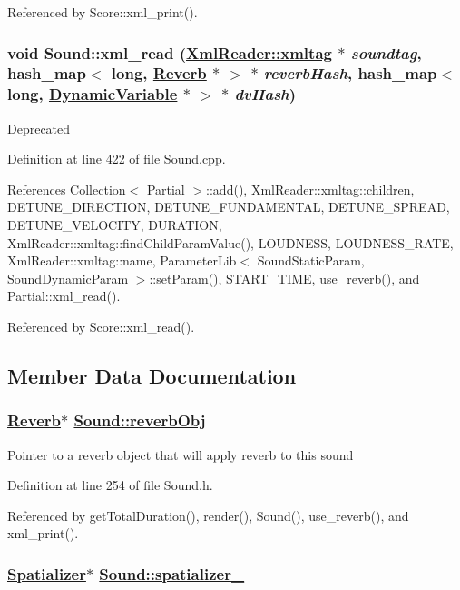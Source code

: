 Referenced by Score::xml\_\-print().\hypertarget{classSound_a10}{
\subsubsection[xml\_\-read]{\setlength{\rightskip}{0pt plus 5cm}void Sound::xml\_\-read (\hyperlink{classXmlReader_1_1xmltag}{Xml\-Reader::xmltag} $\ast$ {\em soundtag}, hash\_\-map$<$ long, \hyperlink{classReverb}{Reverb} $\ast$ $>$ $\ast$ {\em reverb\-Hash}, hash\_\-map$<$ long, \hyperlink{classDynamicVariable}{Dynamic\-Variable} $\ast$ $>$ $\ast$ {\em dv\-Hash})}}
\label{classSound_a10}


\begin{Desc}
\item[\hyperlink{deprecated__deprecated000034}{Deprecated}]\end{Desc}


Definition at line 422 of file Sound.cpp.

References Collection$<$ Partial $>$::add(), Xml\-Reader::xmltag::children, DETUNE\_\-DIRECTION, DETUNE\_\-FUNDAMENTAL, DETUNE\_\-SPREAD, DETUNE\_\-VELOCITY, DURATION, Xml\-Reader::xmltag::find\-Child\-Param\-Value(), LOUDNESS, LOUDNESS\_\-RATE, Xml\-Reader::xmltag::name, Parameter\-Lib$<$ Sound\-Static\-Param, Sound\-Dynamic\-Param $>$::set\-Param(), START\_\-TIME, use\_\-reverb(), and Partial::xml\_\-read().

Referenced by Score::xml\_\-read().

\subsection{Member Data Documentation}
\hypertarget{classSound_r1}{
\subsubsection[reverbObj]{\setlength{\rightskip}{0pt plus 5cm}\hyperlink{classReverb}{Reverb}$\ast$ \hyperlink{classSound_r1}{Sound::reverb\-Obj}}}
\label{classSound_r1}


Pointer to a reverb object that will apply reverb to this sound 

Definition at line 254 of file Sound.h.

Referenced by get\-Total\-Duration(), render(), Sound(), use\_\-reverb(), and xml\_\-print().\hypertarget{classSound_r0}{
\subsubsection[spatializer\_\-]{\setlength{\rightskip}{0pt plus 5cm}\hyperlink{classSpatializer}{Spatializer}$\ast$ \hyperlink{classSound_r0}{Sound::spatializer\_\-}}}
\label{classSound_r0}




